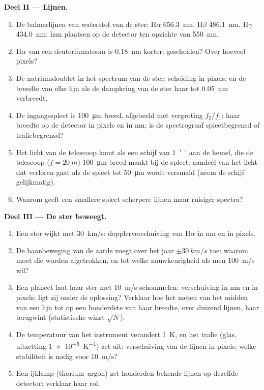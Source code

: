 \begin{problem}
\medskip
\noindent\textbf{Deel II --- Lijnen.}
\begin{enumerate}[resume]
  \item De balmerlijnen van waterstof van de ster: H$\alpha$ \qty{656.3}{nm},
        H$\beta$ \qty{486.1}{nm}, H$\gamma$ \qty{434.0}{nm}: hun plaatsen op de
        detector ten opzichte van \qty{550}{nm}.
  \item H$\alpha$ van een deuteriumatoom is \qty{0.18}{nm} korter: gescheiden?
        Over hoeveel pixels?
  \item De natriumdoublet in het spectrum van de ster: scheiding in
        pixels; en de breedte van elke lijn als de dampkring van de ster
        haar tot \qty{0.05}{nm} verbreedt.
  \item De ingangsspleet is \qty{100}{\micro m} breed, afgebeeld met
        vergroting $f_2/f_1$: haar breedte op de detector in pixels en
        in nm; is de spectrograaf spleetbegrensd of traliebegrensd?
  \item Het licht van de telescoop komt als een schijf van \qty{1}{''} aan
        de hemel, die de telescoop ($f = \qty{20}{m}$) \qty{100}{\micro m}
        breed maakt bij de spleet: aandeel van het licht dat verloren gaat
        als de spleet
        tot \qty{50}{\micro m} wordt versmald (neem de schijf gelijkmatig).
  \item Waarom geeft een smallere spleet scherpere lijnen maar ruisiger
        spectra?
\end{enumerate}

\medskip
\noindent\textbf{Deel III --- De ster beweegt.}
\begin{enumerate}[resume]
  \item Een ster wijkt met \qty{30}{km/s}: dopplerverschuiving van H$\alpha$ in nm
        en in pixels.
  \item De baanbeweging van de aarde voegt over het jaar $\pm\qty{30}{km/s}$ toe:
        waarom moet die worden afgetrokken, en tot welke nauwkeurigheid als men
        \qty{100}{m/s} wil?
  \item Een planeet laat haar ster met \qty{10}{m/s} schommelen:
        verschuiving in nm en
        in pixels; ligt zij onder de oplossing? Verklaar hoe het meten van
        het midden van een lijn tot op een honderdste van haar breedte, over
        duizend lijnen, haar terugwint (statistische winst $\sqrt{N}$).
  \item De temperatuur van het instrument verandert \qty{1}{K}, en het
        tralie (glas, uitzetting \qty{1e-5}{K^{-1}}) zet uit: verschuiving van de
        lijnen in pixels; welke stabiliteit is nodig voor \qty{10}{m/s}?
  \item Een ijklamp (thorium--argon) zet honderden bekende
        lijnen op dezelfde detector: verklaar haar rol.
\end{enumerate}


\end{problem}
